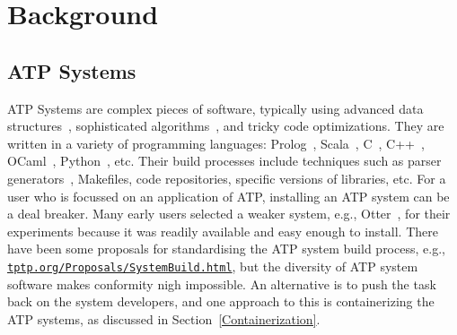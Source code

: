 \documentclass{easychair}
\begin{document}
\section{Background}
\label{Background}

\subsection{ATP Systems}
\label{ATPSystems}

ATP Systems are complex pieces of software, typically using advanced data structures~\cite{Sch13}, 
sophisticated algorithms~\cite{Vor01}, and tricky code optimizations\cite{Sch06}.
They are written in a variety of programming languages: Prolog~\cite{Ott23,Hol23}, 
Scala~\cite{SB18}, C~\cite{SCV19}, C++~\cite{RV02-AICOMM}, OCaml~\cite{Kor06}, Python~\cite{SP20}, 
etc.
Their build processes include techniques such as parser generators~\cite{Ste21}, Makefiles,
code repositories, specific versions of libraries, etc.
For a user who is focussed on an application of ATP,
installing an ATP system can be a deal breaker. 
Many early users selected a weaker system, e.g., Otter~\cite{McC03-Otter}, for their experiments 
because it was readily available and easy enough to install.
There have been some proposals for standardising the ATP system build process, e.g.,
\href{https://tptp.org/Proposals/SystemBuild.html}{\tt tptp.org/Proposals/SystemBuild.html}, 
but the diversity of ATP system software makes conformity nigh impossible.
An alternative is to push the task back on the system developers, and one approach to this is
containerizing the ATP systems, as discussed in Section~\ref{Containerization}.
\end{document}

